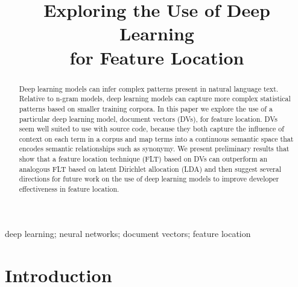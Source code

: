 \documentclass[conference]{IEEEtran}
\begin{document}
\title{Exploring the Use of Deep Learning\\ for Feature Location}
\author{
    \and
    \and
}


\maketitle

\begin{abstract}

Deep learning models can infer complex patterns present in
natural language text. Relative to n-gram models, deep learning models can capture more
complex statistical patterns based on smaller training corpora. In
this paper we explore the use of a particular deep learning model,
document vectors (DVs), for feature location.  DVs seem well suited to
use with source code, because they both capture the influence of
context on each term in a corpus and map terms into a continuous
semantic space that encodes semantic relationships such as
synonymy. We present preliminary results that show that a feature
location technique (FLT) based on DVs can outperform an analogous FLT
based on latent Dirichlet allocation (LDA) and then suggest several
directions for future work on the use of deep learning models to
improve developer effectiveness in feature location.

\end{abstract}

\begin{IEEEkeywords}
deep learning;
neural networks;
document vectors;
feature location
\end{IEEEkeywords}

\section{Introduction}\label{introduction}

\end{document}
